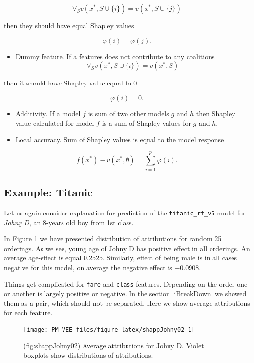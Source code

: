 \documentclass[12pt,]{krantz}
\providecommand{\tightlist}{%
  \setlength{\itemsep}{0pt}\setlength{\parskip}{0pt}}
\theoremstyle{definition}
\theoremstyle{definition}
\theoremstyle{definition}
\theoremstyle{remark}
\begin{document}
\[
\forall_{S} v(x^*, S \cup \{i\}) = v(x^*, S \cup \{j\})
\]

then they should have equal Shapley values

\[
\varphi(i) = \varphi(j).
\]

\begin{itemize}
\tightlist
\item
  Dummy feature. If a features does not contribute to any coalitions \[
  \forall_{S} v(x^*, S \cup \{i\}) = v(x^*, S)
  \]
\end{itemize}

then it should have Shapley value equal to 0

\[
\varphi(i) = 0.
\]

\begin{itemize}
\item
  Additivity. If a model \(f\) is sum of two other models \(g\) and
  \(h\) then Shapley value calculated for model \(f\) is a sum of
  Shapley values for \(g\) and \(h\).
\item
  Local accuracy. Sum of Shapley values is equal to the model response
\end{itemize}

\[
f(x^*) - v(x^*, \emptyset) = \sum_{i=1}^p   \varphi(i). 
\]

\hypertarget{example-titanic-2}{%
\subsection{Example: Titanic}\label{example-titanic-2}}

Let us again consider explanation for prediction of the
\texttt{titanic\_rf\_v6} model for \emph{Johny D}, an 8-years old boy
from 1st class.

In Figure \ref{fig:shappJohny02} we have presented distribution of
attributions for random 25 orderings. As we see, young age of Johny D
has positive effect in all orderings. An average age-effect is equal
\(0.2525\). Similarly, effect of being male is in all cases negative for
this model, on average the negative effect is \(-0.0908\).

Things get complicated for \texttt{fare} and \texttt{class} features.
Depending on the order one or another is largely positive or negative.
In the section \ref{iBreakDown} we showed them as a pair, which should
not be separated. Here we show average attributions for each feature.

\begin{figure}

{\centering \texttt{[image: PM\_VEE\_files/figure-latex/shappJohny02-1]} 

}

\caption{(fig:shappJohny02) Average attributions for Johny D. Violet boxplots show distributions of attributions.}\label{fig:shappJohny02}
\end{figure}
\end{document}
